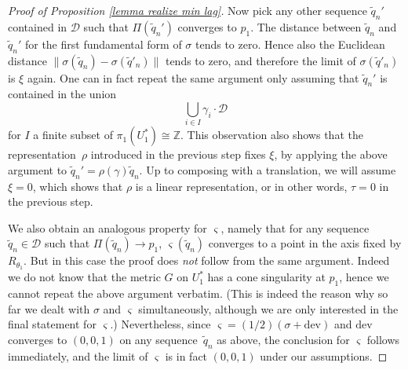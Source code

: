 \documentclass[11pt]{article}
\let\mathcal\mathscr
\theoremstyle{definition}
\newcommand{\dev}{\mathrm{dev}}
\begin{document}
\begin{proof}[Proof of Proposition \ref{lemma realize min lag}]
Now pick any other sequence $\widetilde q_n'$ contained in $\mathcal D$ such that $\Pi(\widetilde q_n')$ converges to $p_1$. The distance between $\widetilde q_n$ and $\widetilde q_n'$ for the first fundamental form of $\sigma$ tends to zero. Hence also the Euclidean distance $\| \sigma(\widetilde q_n)- \sigma(\widetilde q'_n)\|$ tends to zero, and therefore the limit of $ \sigma(\widetilde q'_n)$ is $\xi$ again. One can in fact repeat the same argument only assuming that $\widetilde q_n'$ is contained in the union
\[
\bigcup_{i\in I} \gamma_i\cdot\mathcal D
\]
for $I$ a finite subset of $\pi_1(U_1^*)\cong\mathbb Z$. This observation also shows that the representation~$\rho$ introduced in the previous step fixes $\xi$, by applying the above argument to $\widetilde q_n'=\rho(\gamma)\widetilde q_n$. Up to composing with a translation, we will assume $\xi=0$, which shows that $\rho$ is a linear representation, or in other words, $\tau=0$ in the previous step.

We also obtain an analogous property for $\varsigma$, namely that for any sequence $\widetilde q_n\in\mathcal D$ such that $\Pi(\widetilde q_n)\to p_1$, $\varsigma (\widetilde q_n)$ converges to a point in the axis fixed by $R_{\theta_1}$. But in this case the proof does \emph{not} follow from the same argument. Indeed we do not know that the metric $G$ on $U_1^*$ has a cone singularity at $p_1$, hence we cannot repeat the above argument verbatim. (This is indeed the reason why so far we dealt with $\sigma$ and $\varsigma$ simultaneously, although we are only interested in the final statement for $\varsigma$.)
Nevertheless, since $\varsigma=(1/2)(\sigma+\dev)$ and $\dev$ converges to $(0,0,1)$ on any sequence~$\widetilde q_n$ as above, the conclusion for $\varsigma$ follows immediately, and the limit of $\varsigma$ is in fact $(0,0,1)$ under our assumptions.


\end{proof}
\end{document}
